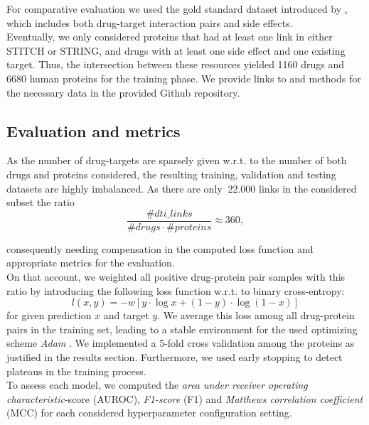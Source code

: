 \documentclass{bioinfo}
\begin{document}
For comparative evaluation we used the gold standard dataset introduced by \citet{Yaminishi2008}, which includes both drug-target interaction pairs and side effects.\\ 
 
Eventually, we only considered proteins that had at least one link in either STITCH or STRING, and drugs with at least one side effect and one existing target. Thus, the intersection between these resources yielded 1160 drugs and 6680 human proteins for the training phase. We provide links to and methods for the necessary data in the provided Github repository.\\

\subsection{Evaluation and metrics}
As the number of drug-targets are sparsely given w.r.t. to the number of both drugs and proteins considered, the resulting training, validation and testing datasets are highly imbalanced. As there are only $~22.000$ links in the considered subset the ratio
\begin{equation*}
	\frac{\#dti\_links}{\#drugs \cdot \#proteins} \approx 360,
\end{equation*}

consequently needing compensation in the computed loss function and appropriate metrics for the evaluation.\\

On that account, we weighted all positive drug-protein pair samples with this ratio by introducing the following loss function w.r.t. to binary cross-entropy:
\begin{equation}
	l(x,y) = - w \left[ y \cdot \log x + (1 - y) \cdot \log (1 - x) \right]
\end{equation}
for given prediction $x$ and target $y$. We average this loss among all drug-protein pairs in the training set, leading to a stable environment for the used optimizing scheme \textit{Adam} \citep{Adam2014}. We implemented a 5-fold cross validation among the proteins as justified in the results section. Furthermore, we  used early stopping to detect plateaus in the training process. \\

To assess each model, we computed the \textit{area under receiver operating characteristic}-score (AUROC), \textit{F1-score} (F1) and \textit{Matthews correlation coefficient} (MCC) for each considered hyperparameter configuration setting.\\
\end{document}
